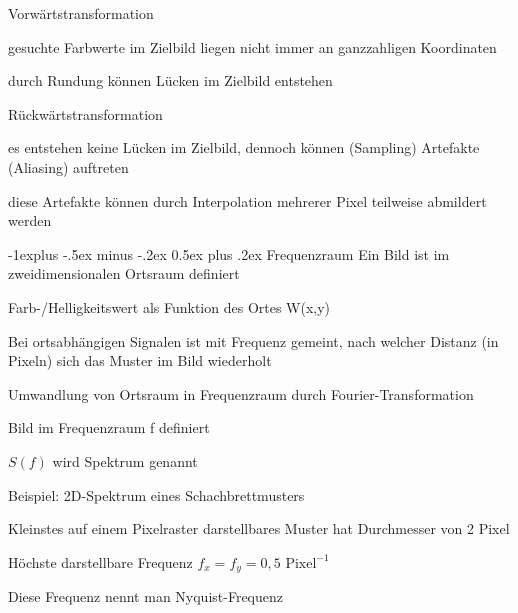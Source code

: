 \documentclass[landscape]{article}
\makeatletter
\renewcommand{\subsection}{\@startsection{subsection}{2}{0mm}%
                                {-1explus -.5ex minus -.2ex}%
                                {0.5ex plus .2ex}%
                                {\normalfont\normalsize\bfseries}}
\makeatother
\begin{document}
\begin{multicols}{3}
  \begin{description*}
    \item[Vorwärtstransformation]
    \begin{itemize*}
      \item gesuchte Farbwerte im Zielbild liegen nicht immer an ganzzahligen Koordinaten
      \item durch Rundung können Lücken im Zielbild entstehen
    \end{itemize*}
    \item[Rückwärtstransformation]
    \begin{itemize*}
      \item es entstehen keine Lücken im Zielbild, dennoch können (Sampling) Artefakte (Aliasing) auftreten
      \item diese Artefakte können durch Interpolation mehrerer Pixel teilweise abmildert werden
    \end{itemize*}
  \end{description*}
  
  \subsection{Frequenzraum}
  Ein Bild ist im zweidimensionalen Ortsraum definiert
  \begin{itemize*}
    \item Farb-/Helligkeitswert als Funktion des Ortes W(x,y)
    \item Bei ortsabhängigen Signalen ist mit Frequenz gemeint, nach welcher Distanz (in Pixeln) sich das Muster im Bild wiederholt
    \item Umwandlung von Ortsraum in Frequenzraum durch Fourier-Transformation
    \begin{itemize*}
      \item Bild im Frequenzraum f definiert
      \item $S(f)$ wird Spektrum genannt
    \end{itemize*}
  \end{itemize*}
  
  Beispiel: 2D-Spektrum eines Schachbrettmusters
  \begin{itemize*}
    \item Kleinstes auf einem Pixelraster darstellbares Muster hat Durchmesser von 2 Pixel
    \item Höchste darstellbare Frequenz $f_x = f_y = 0,5 \text{ Pixel}^{-1}$
    \item Diese Frequenz nennt man Nyquist-Frequenz
  \end{itemize*}
  

\end{multicols}
\end{document}
